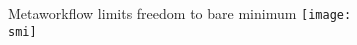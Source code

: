 \documentclass[10pt]{beamer}
\def\smi{out/ln/updir/mw-gcthesis-oral/library.bib}
\begin{document}
    \begin{frame}{Metaworkflow limits freedom to bare minimum}
      \def\smi{out/ln/updir/mw-gcthesis-oral/ink/snakemake/venn_snakemake_metaworkflow.pdf}
      \texttt{[image: \\smi]}%
    \end{frame}
\end{document}
